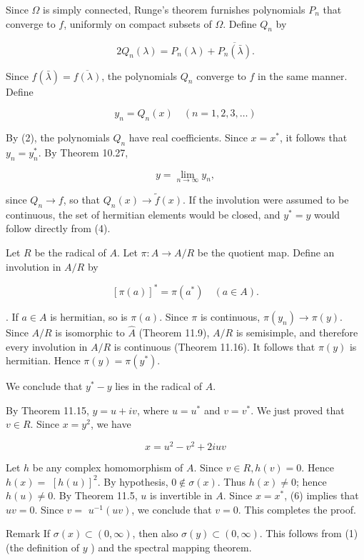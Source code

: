 \documentclass[10pt]{article}
\begin{document}
Since $\Omega$ is simply connected, Runge's theorem furnishes polynomials $P_{n}$ that converge to $f$, uniformly on compact subsets of $\Omega$. Define $Q_{n}$ by

$$
2 Q_{n}(\lambda)=P_{n}(\lambda)+\overline{P_{n}(\bar{\lambda})} .
$$

Since $f(\bar{\lambda})=\overline{f(\lambda)}$, the polynomials $Q_{n}$ converge to $f$ in the same manner. Define

$$
y_{n}=Q_{n}(x) \quad(n=1,2,3, \ldots)
$$

By (2), the polynomials $Q_{n}$ have real coefficients. Since $x=x^{*}$, it follows that $y_{n}=y_{n}^{*}$. By Theorem 10.27,

$$
y=\lim _{n \rightarrow \infty} y_{n},
$$

since $Q_{n} \rightarrow f$, so that $Q_{n}(x) \rightarrow \tilde{f}(x)$. If the involution were assumed to be continuous, the set of hermitian elements would be closed, and $y^{*}=y$ would follow directly from (4).

Let $R$ be the radical of $A$. Let $\pi: A \rightarrow A / R$ be the quotient map. Define an involution in $A / R$ by

$$
[\pi(a)]^{*}=\pi\left(a^{*}\right) \quad(a \in A) .
$$

. If $a \in A$ is hermitian, so is $\pi(a)$. Since $\pi$ is continuous, $\pi\left(y_{n}\right) \rightarrow \pi(y)$. Since $A / R$ is isomorphic to $\hat{A}$ (Theorem 11.9), $A / R$ is semisimple, and therefore every involution in $A / R$ is continuous (Theorem 11.16). It follows that $\pi(y)$ is hermitian. Hence $\pi(y)=\pi\left(y^{*}\right)$.

We conclude that $y^{*}-y$ lies in the radical of $A$.

By Theorem 11.15, $y=u+i v$, where $u=u^{*}$ and $v=v^{*}$. We just proved that $v \in R$. Since $x=y^{2}$, we have

$$
x=u^{2}-v^{2}+2 i u v
$$

Let $h$ be any complex homomorphism of $A$. Since $v \in R, h(v)=0$. Hence $h(x)=$ $[h(u)]^{2}$. By hypothesis, $0 \notin \sigma(x)$. Thus $h(x) \neq 0$; hence $h(u) \neq 0$. By Theorem 11.5, $u$ is invertible in $A$. Since $x=x^{*}$, (6) implies that $u v=0$. Since $v=$ $u^{-1}(u v)$, we conclude that $v=0$. This completes the proof.

Remark If $\sigma(x) \subset(0, \infty)$, then also $\sigma(y) \subset(0, \infty)$. This follows from (1) (the definition of $y$ ) and the spectral mapping theorem.
\end{document}
